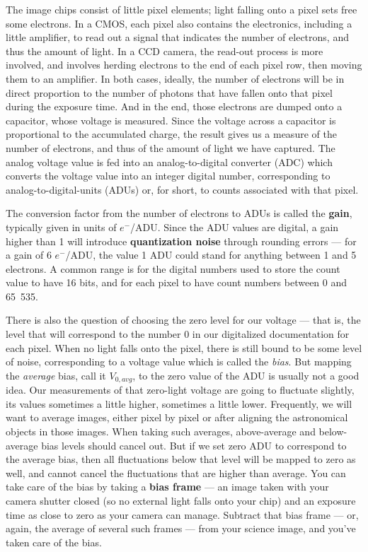 \documentclass[twocolumn,apj]{openjournal}
\begin{document}
The image chips consist of little pixel elements; light falling onto a pixel sets free some electrons. In a CMOS, each pixel also contains the electronics, including a little amplifier, to read out a signal that indicates the number of electrons, and thus the amount of light. In a CCD camera, the read-out process is more involved, and involves herding electrons to the end of each pixel row, then moving them to an amplifier. In both cases, ideally, the number of electrons will be in direct proportion to the number of photons that have fallen onto that pixel during the exposure time. And in the end, those electrons are dumped onto a capacitor, whose voltage is measured. Since the voltage across a capacitor is proportional to the accumulated charge, the result gives us a measure of the number of electrons, and thus of the amount of light we have captured. The analog voltage value is fed into an analog-to-digital converter (ADC) which converts the voltage value into an integer digital number, corresponding to analog-to-digital-units (ADUs) or, for short, to counts associated with that pixel.

The conversion factor from the number of electrons to ADUs is called the {\bf gain}, typically given in units of $e^-$/ADU. Since the ADU values are digital, a gain higher than 1 will introduce {\bf quantization noise} through rounding errors --- for a gain of 6 $e^-$/ADU, the value 1 ADU could stand for anything between 1 and 5 electrons. A common range is for the digital numbers used to store the count value to have 16 bits, and for each pixel to have count numbers between 0 and 65~535.

There is also the question of choosing the zero level for our voltage --- that is, the level that will correspond to the number 0 in our digitalized documentation for each pixel. When no light falls onto the pixel, there is still bound to be some level of noise, corresponding to a voltage value which is called the {\em bias}. But mapping the {\em average} bias, call it $V_{0,avg}$, to the zero value of the ADU is usually not a good idea. Our measurements of that zero-light voltage are going to fluctuate slightly, its values sometimes a little higher, sometimes a little lower. Frequently, we will want to average images, either pixel by pixel or after aligning the astronomical objects in those images. When taking such averages, above-average and below-average bias levels should cancel out. But if we set zero ADU to correspond to the average bias, then all fluctuations below that level will be mapped to zero as well, and cannot cancel the fluctuations that are higher than average.
You can take care of the bias by taking a {\bf bias frame} --- an image taken with your camera shutter closed (so no external light falls onto your chip) and an exposure time as close to zero as your camera can manage. Subtract that bias frame --- or, again, the average of several such frames --- from your science image, and you've taken care of the bias. 
\end{document}
